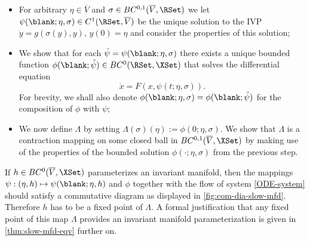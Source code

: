 \documentclass[a4paper]{siamart190516}
\begin{document}
\vspace{0.2cm}

 \begin{itemize}
 \item[\underline{\bf{Step 1}}]  For arbitrary $\eta \in \overline{V}$ and $\sigma \in BC^{0,1}(\overline{V},\RSet)$ we let $\psi(\blank; \eta, \sigma) \in C^1(\RSet, \overline{V})$ be the unique solution to the IVP $\dot{y} = g(\sigma(y),y), \, y(0) = \eta$ and consider the properties of this solution;
 \item[\underline{\bf{Step 2}}]  We show that for each $\tilde{\psi} = \psi(\blank ; \eta, \sigma)$ there exists a unique bounded function $\phi(\blank; \tilde{\psi}) \in BC^0(\RSet, \XSet)$ that solves the differential equation
 \[
\dot{x} = F(x,\psi(t;\eta,\sigma)).
\]
For brevity, we shall also denote $\phi(\blank; \eta, \sigma) = \phi(\blank ; \tilde{\psi})$ for the composition of $\phi$ with $\psi$;
 \item[\underline{\bf{Step 3}}]  We now define $\Lambda$ by setting $\Lambda(\sigma)(\eta) := \phi(0;\eta,\sigma)$. We show that $\Lambda$ is a contraction mapping on some closed ball in $BC^{0,1}(\overline{V},\XSet)$ by making use of the properties of the bounded solution $\phi(\cdot; \eta, \sigma)$ from the previous step. 
 \end{itemize} 
 
 \vspace{0.2cm}
 
If $h \in BC^0(\overline{V}, \XSet)$ parameterizes an invariant manifold, then the mappings
$\psi: (\eta, h) \mapsto \psi(\blank; \eta, h)$ and $\phi$ together with the flow of
system \cref{ODE-system} should satisfy a commutative diagram as displayed in
\cref{fig:com-dia-slow-mfd}. Therefore $h$ has to be a fixed point of $\Lambda$. A
formal justification that any fixed point of this map $\Lambda$ provides an invariant
manifold parameterization is given in \cref{thm:slow-mfd-eqv} further on. 
\end{document}
